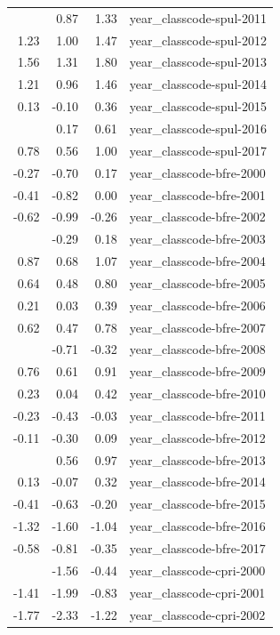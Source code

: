 \documentclass[]{article}
\begin{document}
\begin{longtable}[t]{rrrl}
\addlinespace
1.10 & 0.87 & 1.33 & year\_classcode-spul-2011\\
1.23 & 1.00 & 1.47 & year\_classcode-spul-2012\\
1.56 & 1.31 & 1.80 & year\_classcode-spul-2013\\
1.21 & 0.96 & 1.46 & year\_classcode-spul-2014\\
0.13 & -0.10 & 0.36 & year\_classcode-spul-2015\\
\addlinespace
0.39 & 0.17 & 0.61 & year\_classcode-spul-2016\\
0.78 & 0.56 & 1.00 & year\_classcode-spul-2017\\
-0.27 & -0.70 & 0.17 & year\_classcode-bfre-2000\\
-0.41 & -0.82 & 0.00 & year\_classcode-bfre-2001\\
-0.62 & -0.99 & -0.26 & year\_classcode-bfre-2002\\
\addlinespace
-0.05 & -0.29 & 0.18 & year\_classcode-bfre-2003\\
0.87 & 0.68 & 1.07 & year\_classcode-bfre-2004\\
0.64 & 0.48 & 0.80 & year\_classcode-bfre-2005\\
0.21 & 0.03 & 0.39 & year\_classcode-bfre-2006\\
0.62 & 0.47 & 0.78 & year\_classcode-bfre-2007\\
\addlinespace
-0.51 & -0.71 & -0.32 & year\_classcode-bfre-2008\\
0.76 & 0.61 & 0.91 & year\_classcode-bfre-2009\\
0.23 & 0.04 & 0.42 & year\_classcode-bfre-2010\\
-0.23 & -0.43 & -0.03 & year\_classcode-bfre-2011\\
-0.11 & -0.30 & 0.09 & year\_classcode-bfre-2012\\
\addlinespace
0.76 & 0.56 & 0.97 & year\_classcode-bfre-2013\\
0.13 & -0.07 & 0.32 & year\_classcode-bfre-2014\\
-0.41 & -0.63 & -0.20 & year\_classcode-bfre-2015\\
-1.32 & -1.60 & -1.04 & year\_classcode-bfre-2016\\
-0.58 & -0.81 & -0.35 & year\_classcode-bfre-2017\\
\addlinespace
-1.00 & -1.56 & -0.44 & year\_classcode-cpri-2000\\
-1.41 & -1.99 & -0.83 & year\_classcode-cpri-2001\\
-1.77 & -2.33 & -1.22 & year\_classcode-cpri-2002\\

\end{longtable}
\end{document}
